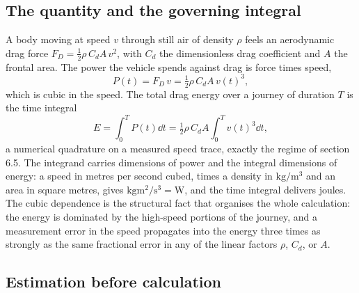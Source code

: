 \subsection{The quantity and the governing integral}

A body moving at speed $v$ through still air of density $\rho$ feels an
aerodynamic drag force $F_{D} = \tfrac{1}{2}\rho\,C_{d}A\,v^{2}$, with
$C_{d}$ the dimensionless drag coefficient and $A$ the frontal area.
The power the vehicle spends against drag is force times speed,
\[
P(t) = F_{D}\,v = \tfrac{1}{2}\rho\,C_{d}A\,v(t)^{3},
\]
which is cubic in the speed. The total drag energy over a journey of
duration $T$ is the time integral
\[
E = \int_{0}^{T} P(t)\dd t = \tfrac{1}{2}\rho\,C_{d}A
\int_{0}^{T} v(t)^{3}\dd t,
\]
a numerical quadrature on a measured speed trace, exactly the regime of
section 6.5. The integrand carries dimensions of power and the integral
dimensions of energy: a speed in metres per second cubed, times a
density in $\si{\kilogram\per\cubic\meter}$ and an area in square
metres, gives $\si{\kilogram\meter\squared\per\second\cubed} =
\si{\watt}$, and the time integral delivers joules. The
cubic dependence is the structural fact that organises the whole
calculation: the energy is dominated by the high-speed portions of the
journey, and a measurement error in the speed propagates into the
energy three times as strongly as the same fractional error in any of
the linear factors $\rho$, $C_{d}$, or $A$.

\subsection{Estimation before calculation}

